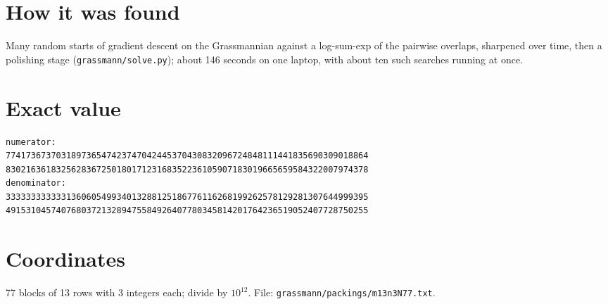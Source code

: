 \documentclass[11pt,a4paper]{article}
\begin{document}
\section{How it was found}
Many random starts of gradient descent on the Grassmannian against a log-sum-exp of the pairwise overlaps, sharpened over time, then a polishing stage (\texttt{grassmann/solve.py}); about 146 seconds on one laptop, with about ten such searches running at once.


\appendix
\section{Exact value}
{\small
\begin{verbatim}
numerator:
774173673703189736547423747042445370430832096724848111441835690309018864
830216361832562836725018017123168352236105907183019665659584322007974378
denominator:
333333333333136060549934013288125186776116268199262578129281307644999395
491531045740768037213289475584926407780345814201764236519052407728750255
\end{verbatim}}

\section{Coordinates}
77 blocks of 13 rows with 3 integers each; divide by $10^{12}$. File: \texttt{grassmann/packings/m13n3N77.txt}.
{\tiny
\begin{multicols}{3}
\end{multicols}}
\end{document}
